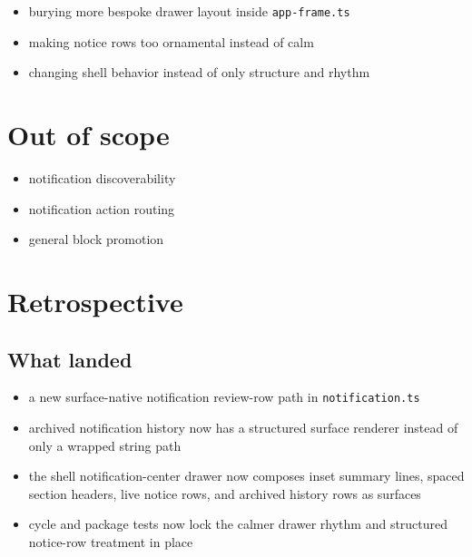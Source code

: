 \begin{itemize}
\tightlist
\item
  burying more bespoke drawer layout inside \texttt{a\allowbreak{}p\allowbreak{}p\allowbreak{}-\allowbreak{}f\allowbreak{}r\allowbreak{}a\allowbreak{}m\allowbreak{}e\allowbreak{}.\allowbreak{}t\allowbreak{}s}
\item
  making notice rows too ornamental instead of calm
\item
  changing shell behavior instead of only structure and rhythm
\end{itemize}

\section{Out of scope}\label{record-171-out-of-scope}

\begin{itemize}
\tightlist
\item
  notification discoverability
\item
  notification action routing
\item
  general block promotion
\end{itemize}

\section{Retrospective}\label{record-171-retrospective}

\subsection{What landed}\label{record-171-what-landed}

\begin{itemize}
\tightlist
\item
  a new surface-native notification review-row path in \texttt{n\allowbreak{}o\allowbreak{}t\allowbreak{}i\allowbreak{}f\allowbreak{}i\allowbreak{}c\allowbreak{}a\allowbreak{}t\allowbreak{}i\allowbreak{}o\allowbreak{}n\allowbreak{}.\allowbreak{}t\allowbreak{}s}
\item
  archived notification history now has a structured surface renderer instead of only a wrapped string path
\item
  the shell notification-center drawer now composes inset summary lines, spaced section headers, live notice rows, and archived history rows as surfaces
\item
  cycle and package tests now lock the calmer drawer rhythm and structured notice-row treatment in place
\end{itemize}

